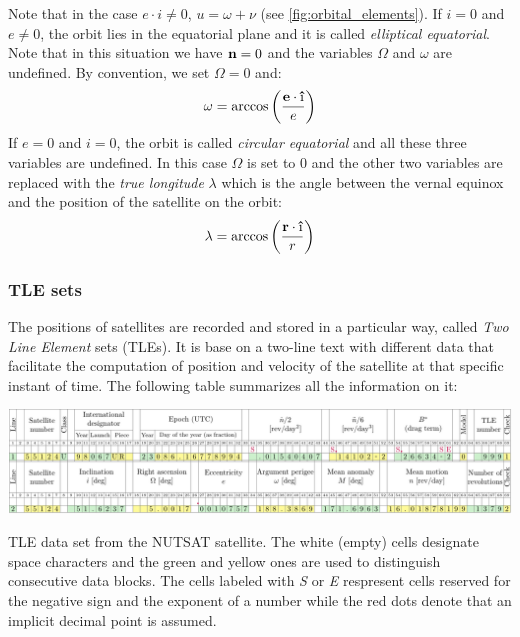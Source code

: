 \documentclass[../main.tex]{subfiles}
\begin{document}
Note that in the case $e\cdot i\ne 0$, $u=\omega+\nu$ (see \cref{fig:orbital_elements}). If $i=0$ and $e\ne 0$, the orbit lies in the equatorial plane and it is called \emph{elliptical equatorial}. Note that in this situation we have $\boldsymbol{\mathrm{n}}=0$ and the variables $\Omega$ and $\omega$ are undefined. By convention, we set $\Omega=0$ and:
\begin{equation}
  \omega=\arccos\left(\frac{\vf{e}\cdot \vf{\hat{\text\i}}}{e}\right)
\end{equation}
If $e=0$ and $i=0$, the orbit is called \emph{circular equatorial} and all these three variables are undefined. In this case $\Omega$ is set to 0 and the other two variables are replaced with the \emph{true longitude} $\lambda$ which is the angle between the vernal equinox and the position of the satellite on the orbit:
\begin{equation}
  \lambda = \arccos\left(\frac{\vf{r}\cdot\vf{\hat{\text\i}}}{r}\right)
\end{equation}
\subsubsection{TLE sets}
The positions of satellites are recorded and stored in a particular way, called \emph{Two Line Element} sets (TLEs). It is base on a two-line text with different data that facilitate the computation of position and velocity of the satellite at that specific instant of time. The following table summarizes all the information on it:
\begin{table}[ht]
  \centering
  \begin{minipage}[ht]{\textwidth}
    \centering
    \includegraphics[width=\textwidth]{Images/TLE.pdf}
  \end{minipage}
  \caption{TLE data set from the NUTSAT satellite. The white (empty) cells designate space characters and the green and yellow ones are used to distinguish consecutive data blocks. The cells labeled with \textit{S} or \textit{E} respresent cells reserved for the negative sign and the exponent of a number while the red dots denote that an implicit decimal point is assumed.}
  \label{tab:TLE}
\end{table}
\end{document}
